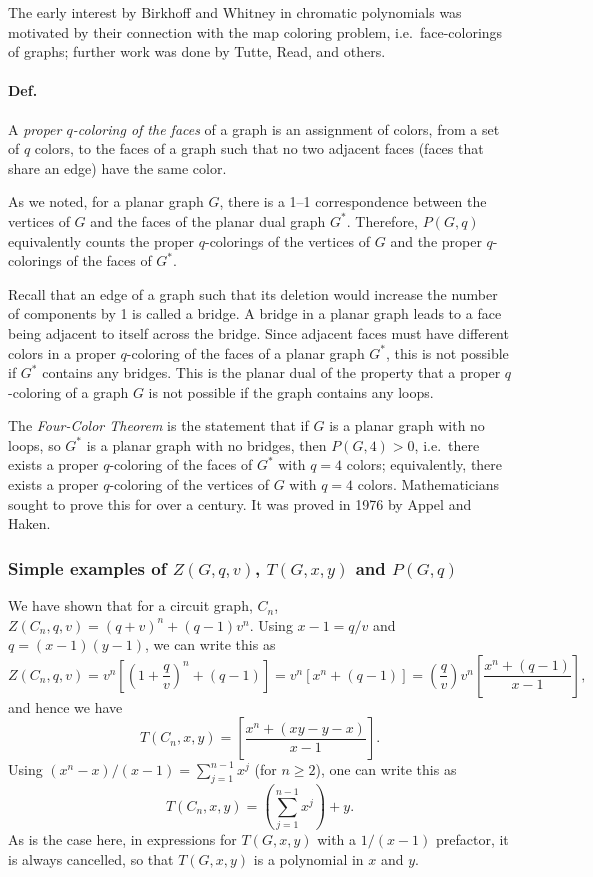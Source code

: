 The early interest by Birkhoff and Whitney in chromatic polynomials was motivated by their connection with the map coloring
problem, i.e.\ face-colorings of graphs; further work was done by Tutte, Read, and others.

\paragraph{Def.} A \emph{proper $q$-coloring of the faces} of a graph is an assignment of colors, from a set of $q$ colors, to the
faces of a graph such that no two adjacent faces (faces that share an edge) have the same color.

As we noted, for a planar graph $G$, there is a 1--1 correspondence between the vertices of $G$ and the faces of the planar dual
graph $G^*$. Therefore, $P(G,q)$ equivalently counts the proper $q$-colorings of the vertices of $G$ and the proper
$q$-colorings of the faces of $G^*$.

Recall that an edge of a graph such that its deletion would increase the number of components by 1 is called a bridge. A
bridge in a planar graph leads to a face being adjacent to itself across the bridge. Since adjacent faces must have different
colors in a proper $q$-coloring of the faces of a planar graph $G^*$, this is not possible if $G^*$ contains any bridges. This is
the planar dual of the property that a proper $q$-coloring of a graph $G$ is not possible if the graph contains any loops.

The \emph{Four-Color Theorem} is the statement that if $G$ is a planar graph with no loops, so $G^*$ is a planar graph with no
bridges, then $P(G,4)>0$, i.e.\ there exists a proper $q$-coloring of the faces of $G^*$ with $q = 4$ colors; equivalently,
there exists a proper $q$-coloring of the vertices of $G$ with $q = 4$ colors. Mathematicians sought to prove this for over a
century. It was proved in 1976 by Appel and Haken.

\subsubsection*{Simple examples of \texorpdfstring{$Z(G,q,v)$, $T(G,x,y)$ and $P(G,q)$}{Z, T and P}}

We have shown that for a circuit graph, $C_n$, $Z(C_n,q,v) = (q+v)^n+(q-1)v^n$. Using $x-1 = q/v$ and $q = (x-1)(y-1)$, we
can write this as
\begin{equation}
  Z(C_n,q,v) = v^n\left[\left(1+\frac{q}{v}\right)^n+(q-1)\right] = v^n\left[x^n+(q-1)\right]
  = \left(\frac{q}{v}\right)v^n\left[\frac{x^n+(q-1)}{x-1}\right],
\end{equation}
and hence we have
\begin{equation}
  T(C_n,x,y) = \left[\frac{x^n+(xy-y-x)}{x-1}\right].
\end{equation}
Using $(x^n-x)/(x-1) = \sum_{j=1}^{n-1}x^j$ (for $n\ge 2$), one can write this as
\begin{equation}
  T(C_n,x,y) = \left(\sum_{j=1}^{n-1}x^j\right)+y .
\end{equation}
As is the case here, in expressions for $T(G,x,y)$ with a $1/(x-1)$ prefactor, it is always cancelled, so that $T(G,x,y)$ is a
polynomial in $x$ and $y$.

